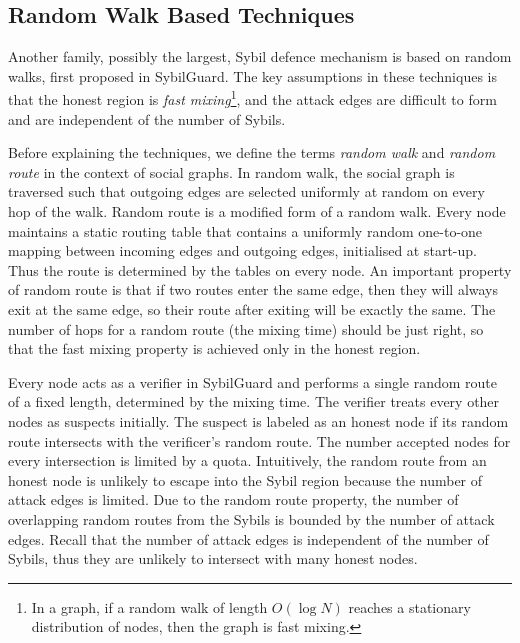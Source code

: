\subsection{Random Walk Based Techniques}\label{sec:random-walk}
Another family, possibly the largest, Sybil defence mechanism is based on random
walks, first proposed in SybilGuard\cite{yu2006sybilguard}. The key assumptions
in these techniques is that the honest region is \emph{fast mixing}\footnote{In
  a graph, if a random walk of length $O(\log{N})$ reaches a stationary
  distribution of nodes, then the graph is fast mixing.}, and the attack edges
are difficult to form and are independent of the number of Sybils.


Before explaining the techniques, we define the terms \emph{random walk} and
\emph{random route} in the context of social graphs. In random walk, the social
graph is traversed such that outgoing edges are selected uniformly at
random on every hop of the walk. Random route is a modified form of a random
walk. Every node maintains a static routing table that contains a uniformly
random one-to-one mapping between incoming edges and outgoing edges, initialised
at start-up. Thus the route is determined by the tables on every node. An
important property of random route is that if two routes enter the same edge,
then they will always exit at the same edge, so their route after exiting will
be exactly the same. The number of hops for a random route (the mixing time)
should be just right, so that the fast mixing property is achieved only in the
honest region.

Every node acts as a verifier in SybilGuard\cite{yu2006sybilguard} and performs
a single random route of a fixed length, determined by the mixing time. The
verifier treats every other nodes as suspects initially. The suspect is labeled
as an honest node if its random route intersects with the verificer's random
route. The number accepted nodes for every intersection is limited by a quota.
Intuitively, the random route from an honest node is unlikely to escape into the
Sybil region because the number of attack edges is limited. Due to the random
route property, the number of overlapping random routes from the
Sybils is bounded by the number of attack edges. Recall that the number of
attack edges is independent of the number of Sybils, thus they are unlikely to
intersect with many honest nodes.

